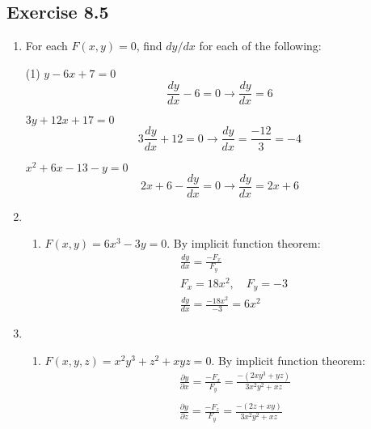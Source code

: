 \documentclass{./../../Latex/homework}
\begin{document}
\thispagestyle{plain}

\subsection*{Exercise 8.5}

\begin{enumerate}

\item[1.] For each $F(x, y) = 0$, find $d y / d x$ for each of the following:
\begin{tasks}(1)
\task $y-6 x+7=0$ $$
\frac{d y}{d x}-6=0 \rightarrow \frac{d y}{d x}=6
$$

\task $3 y+12 x+17=0$
$$
 3 \frac{d y}{d x}+12=0 \rightarrow \frac{d y}{d x}=\frac{-12}{3}=-4
$$

\task $x^{2}+6 x-13-y=0$
$$
 2 x+6-\frac{d y}{d x}=0 \rightarrow \frac{d y}{d x}=2 x+6
$$
\end{tasks}

\item[2.] 
\begin{enumerate}
\item[(d)] $F(x, y)=6 x^{3}-3 y=0$. By implicit function theorem:
$$
\begin{aligned}
& \frac{d y}{d x}=\frac{-F_{x}}{F_{y}} \\
& F_{x}=18 x^{2}, \quad F_{y}=-3 \\
& \frac{d y}{d x}=\frac{-18 x^{2}}{-3}=6 x^{2}
\end{aligned}
$$

\end{enumerate}

\item[3.] 
\begin{enumerate}
\item[(a)] $F(x, y, z)=x^{2} y^{3}+z^{2}+x y z=0$. By implicit function theorem:
$$
\begin{aligned}
& \frac{\partial y}{\partial x}=\frac{-F_{x}}{F_{y}}=\frac{-\left(2 x y^{3}+y z\right)}{3 x^{2} y^{2}+x z} \\~\\
& \frac{\partial y}{\partial z}=\frac{-F_{z}}{F_{y}}=\frac{-(2 z+x y)}{3 x^{2} y^{2}+x z}
\end{aligned}
$$
\end{enumerate}

\end{enumerate}

\end{document}

